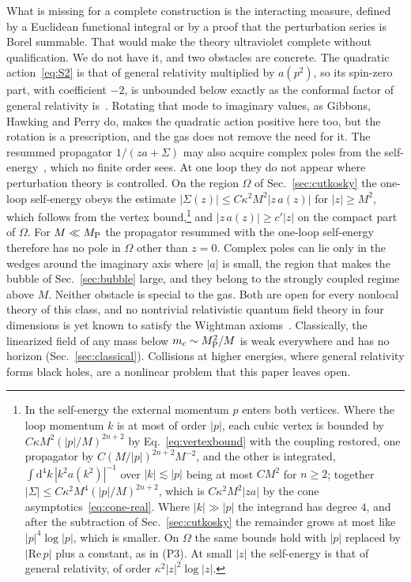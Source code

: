 \documentclass[a4paper,11pt]{article}
\newcommand{\dd}{\mathrm{d}}
\begin{document}
What is missing for a complete construction is the interacting measure, defined by a Euclidean functional integral or by a proof that the perturbation series is Borel summable. That would make the theory ultraviolet complete without qualification. We do not have it, and two obstacles are concrete. The quadratic action~\eqref{eq:S2} is that of general relativity multiplied by $a(p^2)$, so its spin-zero part, with coefficient $-2$, is unbounded below exactly as the conformal factor of general relativity is~\cite{GibbonsHawkingPerry1978}. Rotating that mode to imaginary values, as Gibbons, Hawking and Perry do, makes the quadratic action positive here too, but the rotation is a prescription, and the gas does not remove the need for it. The resummed propagator $1/(za+\Sigma)$ may also acquire complex poles from the self-energy~\cite{Shapiro2015}, which no finite order sees. At one loop they do not appear where perturbation theory is controlled. On the region $\Omega$ of Sec.~\ref{sec:cutkosky} the one-loop self-energy obeys the estimate $|\Sigma(z)|\le C\kappa^2M^2|z\,a(z)|$ for $|z|\ge M^2$, which follows from the vertex bound,\footnote{In the self-energy the external momentum $p$ enters both vertices. Where the loop momentum $k$ is at most of order $|p|$, each cubic vertex is bounded by $C\kappa M^2(|p|/M)^{2n+2}$ by Eq.~\eqref{eq:vertexbound} with the coupling restored, one propagator by $C(M/|p|)^{2n+2}M^{-2}$, and the other is integrated, $\int\dd^4k\,|k^2a(k^2)|^{-1}$ over $|k|\lesssim|p|$ being at most $CM^2$ for $n\ge2$; together $|\Sigma|\le C\kappa^2M^4(|p|/M)^{2n+2}$, which is $C\kappa^2M^2|za|$ by the cone asymptotics~\eqref{eq:cone-real}. Where $|k|\gg|p|$ the integrand has degree $4$, and after the subtraction of Sec.~\ref{sec:cutkosky} the remainder grows at most like $|p|^4\log|p|$, which is smaller. On $\Omega$ the same bounds hold with $|p|$ replaced by $|\mathrm{Re}\,p|$ plus a constant, as in (P3). At small $|z|$ the self-energy is that of general relativity, of order $\kappa^2|z|^2\log|z|$.} and $|z\,a(z)|\ge c'|z|$ on the compact part of $\Omega$. For $M\ll M_{\rm P}$ the propagator resummed with the one-loop self-energy therefore has no pole in $\Omega$ other than $z=0$. Complex poles can lie only in the wedges around the imaginary axis where $|a|$ is small, the region that makes the bubble of Sec.~\ref{sec:bubble} large, and they belong to the strongly coupled regime above $M$. Neither obstacle is special to the gas. Both are open for every nonlocal theory of this class, and no nontrivial relativistic quantum field theory in four dimensions is yet known to satisfy the Wightman axioms~\cite{JaffeWitten2006}. Classically, the linearized field of any mass below $m_c\sim M_{\rm P}^2/M$ is weak everywhere and has no horizon (Sec.~\ref{sec:classical}). Collisions at higher energies, where general relativity forms black holes, are a nonlinear problem that this paper leaves open.
\end{document}
